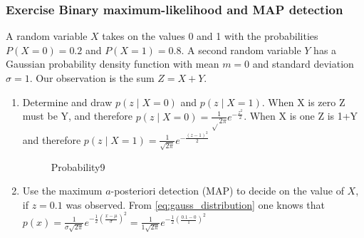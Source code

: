 \subsubsection{Exercise Binary maximum-likelihood and MAP detection}
A random variable $X$ takes on the values 0 and 1 with the probabilities $P(X=0)=0.2$ and $P(X=1)=0.8$. A second random variable $Y$ has a Gaussian probability density function with mean $m=0$ and standard deviation $\sigma=1$. Our observation is the sum $Z=X+Y$.
\begin{enumerate}
    \item Determine and draw $p(z \mid X=0)$ and $p(z \mid X=1)$.\newline
    When X is zero Z must be Y, and therefore $p(z \mid X=0)=\frac{1}{\sqrt{ } 2 \pi} e^{-\frac{z^2}{2}}$. When X is one Z is 1+Y and therefore $p(z \mid X=1)=\frac{1}{\sqrt{2 \pi}} e^{-\frac{(z-1)^2}{2}}$
    \begin{figure}[ht]
      \centering
      \caption{Probability9}
      \label{fig:probability_9}
    \end{figure}
    \item Use the maximum $a$-posteriori detection (MAP) to decide on the value of $X$, if $z=0.1$ was observed.\newline
    From \autoref{eq:gauss_distribution} one knows that $p(x)=\frac{1}{\sigma \sqrt{2 \pi}} e^{-\frac{1}{2}(\frac{x-\mu}{\sigma})^2}=\frac{1}{1 \sqrt{2 \pi}} e^{-\frac{1}{2}(\frac{0.1-0}{1})^2}$


\end{enumerate}
